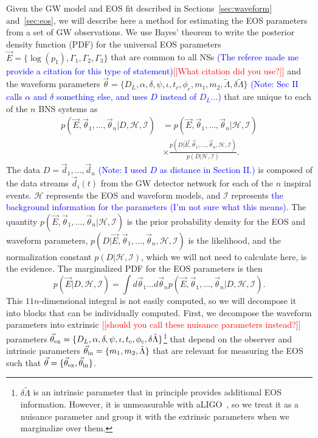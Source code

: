 \documentclass[twocolumn,prd,amssymb,aps,nofootinbib,showpacs,epsf]{revtex4}
\newcommand{\red}{\textcolor{red}}
\newcommand\ben[2]{\textcolor{red}{{#1}\sout{#2}}}
\newcommand\les[2]{\textcolor{blue}{{#1}\sout{#2}}}
\begin{document}
Given the GW model and EOS fit described in Sections~\ref{sec:waveform} and~\ref{sec:eos}, we will describe here a method for estimating the EOS parameters from a set of GW observations. We use Bayes' theorem to write the posterior density function (PDF) for the universal EOS parameters $\vec E = \{\log(p_1), \Gamma_1, \Gamma_2, \Gamma_3\}$ that are common to all NSs \les{(The referee made me provide a citation for this type of statement)}{}\ben{[[What citation did you use?]]}{} and the waveform parameters $\vec\theta = \{D_L, \alpha, \delta, \psi, \iota, t_c, \phi_c, m_1, m_2, \tilde\Lambda, \delta\tilde\Lambda\}$ \les{(Note: Sec II calls $\alpha$ and $\delta$ something else, and uses $D$ instead of $D_L$...)}{} that are unique to each of the $n$ BNS systems as
\begin{equation}
\begin{split}
p(\vec E,\vec\theta_1,\dots,\vec\theta_n | D,\mathcal{H},\mathcal{I})
&= p(\vec E,\vec\theta_1,\dots,\vec\theta_n | \mathcal{H},\mathcal{I}) \\
& \times\frac{ p(D | \vec E,\vec\theta_1,\dots,\vec\theta_n,\mathcal{H},\mathcal{I}) }{ p(D | \mathcal{H},\mathcal{I}) }.
\end{split}
\end{equation}
The data $D = \vec d_1,\dots, \vec d_n$ \les{(Note: I used $D$ as distance in Section II.)}{} is composed of the data streams $\vec d_i(t)$ from the GW detector network for each of the $n$ inspiral events. $\mathcal{H}$ represents the EOS and waveform models, and $\mathcal{I}$ represents \les{the background information for the parameters (I'm not sure what this means)}{}. The quantity $p(\vec E,\vec\theta_1,\dots,\vec\theta_n | \mathcal{H},\mathcal{I})$ is the prior probability density for the EOS and waveform parameters, $p(D | \vec E,\vec\theta_1,\dots,\vec\theta_n,\mathcal{H},\mathcal{I})$ is the likelihood, and the normalization constant $p(D | \mathcal{H},\mathcal{I})$, which we will not need to calculate here, is the evidence. The marginalized PDF for the EOS parameters is then
\begin{equation}
\label{eq:margEOS}
p(\vec E | D,\mathcal{H},\mathcal{I}) = \int d\vec\theta_1 \dots d\vec\theta_n p(\vec E,\vec\theta_1,\dots,\vec\theta_n | D,\mathcal{H},\mathcal{I}).
\end{equation}
This $11n$-dimensional integral is not easily computed, so we will decompose it into blocks that can be individually computed. First, we decompose the waveform parameters into extrinsic \red{[[should you call these nuisance parameters instead?]]} parameters $\vec\theta_{\rm ex} = \{D_L, \alpha, \delta, \psi, \iota, t_c, \phi_c, \delta\tilde\Lambda\}$\footnote{$\delta\tilde\Lambda$ is an intrinsic parameter that in principle provides additional EOS information. However, it is unmeasurable with aLIGO~\cite{WadeCreightonOchsner2014}, so we treat it as a nuisance parameter and group it with the extrinsic parameters when we marginalize over them.} that depend on the observer and intrinsic parameters $\vec\theta_{\rm in} = \{m_1, m_2, \tilde\Lambda\}$ that are relevant for measuring the EOS such that $\vec\theta = \{\vec\theta_{\rm ex}, \vec\theta_{\rm in}\}$.
\end{document}
